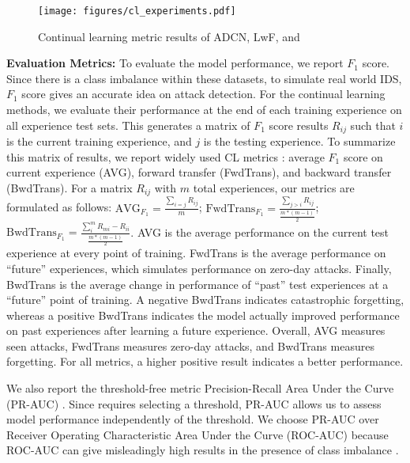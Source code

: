 \begin{figure*}
    \centering
    \texttt{[image: figures/cl\_experiments.pdf]}
    \caption{Continual learning metric results of ADCN\cite{ashfahani2023unsupervised}, LwF\cite{lwf2019Li}, and \Design{}}
    \label{fig:continual_methods_results}
\end{figure*}

\textbf{Evaluation Metrics:} To evaluate the model performance, we report $F_{1}$ score. Since there is a class imbalance within these datasets, to simulate real world IDS, $F_{1}$ score gives an accurate idea on attack detection. For the continual learning methods, we evaluate their performance at the end of each training experience on all experience test sets. This generates a matrix of $F_{1}$ score results $R_{ij}$ such that $i$ is the current training experience, and $j$ is the testing experience. To summarize this matrix of results, we report widely used CL metrics \cite{diaz2018don}: average $F_{1}$ score on current experience (AVG), forward transfer (FwdTrans), and backward transfer (BwdTrans). For a matrix $R_{ij}$ with $m$ total experiences, our metrics are formulated as follows: $\text{AVG}_{F_1} = \frac{\sum_{i = j} R_{ij}}{m}$; $\text{FwdTrans}_{F_1} = \frac{\sum_{j>i} R_{ij}}{\frac{m * (m-1)}{2}}$; $\text{BwdTrans}_{F_1} = \frac{\sum_{i}^m R_{mi} - R_{ii}}{\frac{m * (m-1)}{2}}$.
AVG is the average performance on the current test experience at every point of training. FwdTrans is the average performance on ``future'' experiences, which simulates performance on zero-day attacks. Finally, BwdTrans is the average change in performance of ``past'' test experiences at a ``future'' point of training. A negative BwdTrans indicates catastrophic forgetting, whereas a positive BwdTrans  indicates the model actually improved performance on past experiences after learning a future experience. Overall, AVG measures seen attacks, FwdTrans measures zero-day attacks, and BwdTrans measures forgetting. For all metrics, a higher positive result indicates a better performance. 

We also report the threshold-free metric Precision-Recall Area Under the Curve (PR-AUC) \cite{praucDavid06}. Since \Design{} requires selecting a threshold, PR-AUC allows us to assess model performance independently of the threshold. We choose PR-AUC over Receiver Operating Characteristic Area Under the Curve (ROC-AUC) because ROC-AUC can give misleadingly high results in the presence of class imbalance \cite{praucDavid06}.

